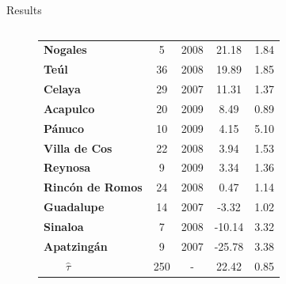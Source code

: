 \documentclass[final]{beamer}
\newlength{\sepwid}
\newlength{\onecolwid}
\newlength{\twocolwid}
\begin{document}
\begin{frame}[t]
\begin{columns}[t]
\begin{column}{\twocolwid}
\begin{block}{Results}
\begin{columns}[t,totalwidth=\twocolwid]
\begin{column}{\onecolwid}
\begin{figure}[htdp]
{\begin{minipage}[ht]{0.58\linewidth}
{\begin{tabular}{lcccc}
					   \textbf{Nogales} & 5 & 2008 & 21.18 & 1.84 \\ 
					   \textbf{Te\'{u}l}  & 36 & 2008 & 19.89 & 1.85 \\
					   \textbf{Celaya}  & 29 & 2007 & 11.31 & 1.37 \\ 
					   \textbf{Acapulco}  & 20 & 2009 & 8.49 & 0.89 \\ 
					   \textbf{P\'{a}nuco}  & 10 & 2009 & 4.15 & 5.10 \\ 
					  \textbf{Villa de Cos}  & 22 & 2008 & 3.94 & 1.53 \\ 
					   \textbf{Reynosa}  & 9 & 2009 & 3.34 & 1.36 \\ 
					   \textbf{Rinc\'{o}n de Romos}  & 24 & 2008 & 0.47 & 1.14 \\ 
					   \textbf{Guadalupe}  & 14 & 2007 & -3.32 & 1.02 \\ 
					   \textbf{Sinaloa}  & 7 & 2008 & -10.14 & 3.32 \\ 
					   \textbf{Apatzing\'{a}n} & 9 & 2007 & -25.78 & 3.38 \\
					\hline
					\hline 
					  $\quad \quad \hat{\tau}$  & 250 & - & 22.42 & 0.85 \\ 
					   \hline
					\end{tabular}}
	              \end{minipage}\hfill
	            }
	            \end{figure}
	          \end{column}
	        \end{columns}
	      \end{block}
    \end{column}


    \begin{column}{\sepwid}\end{column}	



\end{columns}
\end{frame}
\end{document}
